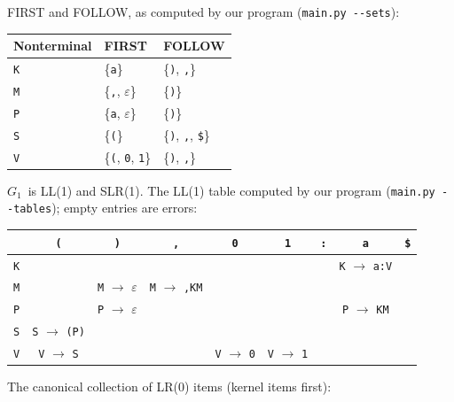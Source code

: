 \documentclass[11pt]{article}
\newcommand{\G}{\ensuremath{G_1}}
\begin{document}
\noindent FIRST and FOLLOW, as computed by our program (\texttt{main.py -{}-sets}):

\begin{center}\small
\begin{tabular}{lll}
\toprule
Nonterminal & FIRST & FOLLOW \\
\midrule
\texttt{K} & \{\texttt{a}\} & \{\texttt{)}, \texttt{,{}}\} \\
\texttt{M} & \{\texttt{,{}}, $\varepsilon$\} & \{\texttt{)}\} \\
\texttt{P} & \{\texttt{a}, $\varepsilon$\} & \{\texttt{)}\} \\
\texttt{S} & \{\texttt{(}\} & \{\texttt{)}, \texttt{,{}}, \texttt{\$}\} \\
\texttt{V} & \{\texttt{(}, \texttt{0}, \texttt{1}\} & \{\texttt{)}, \texttt{,{}}\} \\
\bottomrule
\end{tabular}
\end{center}

\noindent \G\ is LL(1) and SLR(1). The LL(1) table computed by our program
(\texttt{main.py -{}-tables}); empty entries are errors:

\begin{center}\small
\begin{tabular}{lcccccccc}
\toprule
 & \texttt{(} & \texttt{)} & \texttt{,{}} & \texttt{0} & \texttt{1} & \texttt{:} & \texttt{a} & \texttt{\$} \\
\midrule
\texttt{K} &  &  &  &  &  &  & \texttt{K} $\to$ \texttt{a:V} &  \\
\texttt{M} &  & \texttt{M} $\to$ $\varepsilon$ & \texttt{M} $\to$ \texttt{,{}KM} &  &  &  &  &  \\
\texttt{P} &  & \texttt{P} $\to$ $\varepsilon$ &  &  &  &  & \texttt{P} $\to$ \texttt{KM} &  \\
\texttt{S} & \texttt{S} $\to$ \texttt{(P)} &  &  &  &  &  &  &  \\
\texttt{V} & \texttt{V} $\to$ \texttt{S} &  &  & \texttt{V} $\to$ \texttt{0} & \texttt{V} $\to$ \texttt{1} &  &  &  \\
\bottomrule
\end{tabular}
\end{center}

\noindent The canonical collection of LR(0) items (kernel items first):
\end{document}
